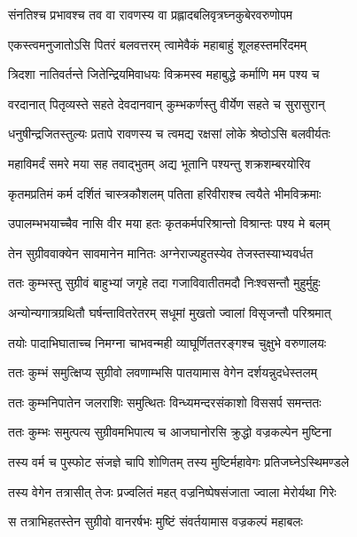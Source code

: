 \twolineshloka
{संनतिश्च प्रभावश्च तव वा रावणस्य वा}
{प्रह्लादबलिवृत्रघ्नकुबेरवरुणोपम} %

\twolineshloka
{एकस्त्वमनुजातोऽसि पितरं बलवत्तरम्}
{त्वामेवैकं महाबाहुं शूलहस्तमरिंदमम्} %

\twolineshloka
{त्रिदशा नातिवर्तन्ते जितेन्द्रियमिवाधयः}
{विक्रमस्व महाबुद्धे कर्माणि मम पश्य च} %

\twolineshloka
{वरदानात् पितृव्यस्ते सहते देवदानवान्}
{कुम्भकर्णस्तु वीर्येण सहते च सुरासुरान्} %

\twolineshloka
{धनुषीन्द्रजितस्तुल्यः प्रतापे रावणस्य च}
{त्वमद्य रक्षसां लोके श्रेष्ठोऽसि बलवीर्यतः} %

\twolineshloka
{महाविमर्दं समरे मया सह तवाद्भुतम्}
{अद्य भूतानि पश्यन्तु शक्रशम्बरयोरिव} %

\twolineshloka
{कृतमप्रतिमं कर्म दर्शितं चास्त्रकौशलम्}
{पतिता हरिवीराश्च त्वयैते भीमविक्रमाः} %

\twolineshloka
{उपालम्भभयाच्चैव नासि वीर मया हतः}
{कृतकर्मपरिश्रान्तो विश्रान्तः पश्य मे बलम्} %

\twolineshloka
{तेन सुग्रीववाक्येन सावमानेन मानितः}
{अग्नेराज्यहुतस्येव तेजस्तस्याभ्यवर्धत} %

\twolineshloka
{ततः कुम्भस्तु सुग्रीवं बाहुभ्यां जगृहे तदा}
{गजाविवातीतमदौ निःश्वसन्तौ मुहुर्मुहुः} %

\twolineshloka
{अन्योन्यगात्रग्रथितौ घर्षन्तावितरेतरम्}
{सधूमां मुखतो ज्वालां विसृजन्तौ परिश्रमात्} %

\twolineshloka
{तयोः पादाभिघाताच्च निमग्ना चाभवन्मही}
{व्याघूर्णिततरङ्गश्च चुक्षुभे वरुणालयः} %

\twolineshloka
{ततः कुम्भं समुत्क्षिप्य सुग्रीवो लवणाम्भसि}
{पातयामास वेगेन दर्शयन्नुदधेस्तलम्} %

\twolineshloka
{ततः कुम्भनिपातेन जलराशिः समुत्थितः}
{विन्ध्यमन्दरसंकाशो विससर्प समन्ततः} %

\twolineshloka
{ततः कुम्भः समुत्पत्य सुग्रीवमभिपात्य च}
{आजघानोरसि क्रुद्धो वज्रकल्पेन मुष्टिना} %

\twolineshloka
{तस्य वर्म च पुस्फोट संजज्ञे चापि शोणितम्}
{तस्य मुष्टिर्महावेगः प्रतिजघ्नेऽस्थिमण्डले} %

\twolineshloka
{तस्य वेगेन तत्रासीत् तेजः प्रज्वलितं महत्}
{वज्रनिष्पेषसंजाता ज्वाला मेरोर्यथा गिरेः} %

\twolineshloka
{स तत्राभिहतस्तेन सुग्रीवो वानरर्षभः}
{मुष्टिं संवर्तयामास वज्रकल्पं महाबलः} %

